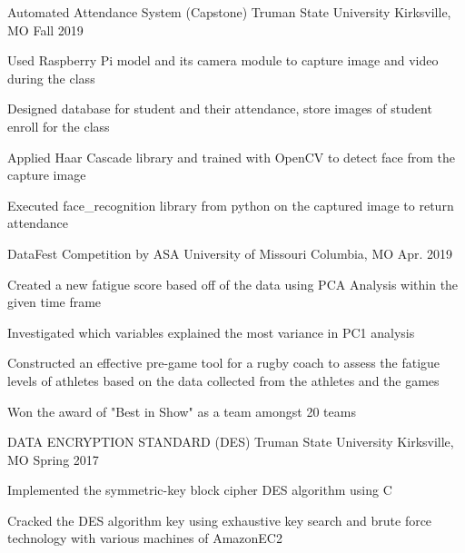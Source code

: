 \begin{cventries}
  \cventry
    {Automated Attendance System (Capstone) }
    {Truman State University}
    {Kirksville, MO}
    {Fall 2019 }
    {
      \begin{cvitems}
        \item {Used Raspberry Pi model and its camera module to capture image and video during the class}
        \vspace{0.5mm}
        \item {Designed database for student and their attendance, store images of student enroll for the class}
        \vspace{0.5mm}
        \item{Applied Haar Cascade library and trained with OpenCV to detect face from the capture image}
        \vspace{0.5mm}
        \item {Executed face\_recognition library from python on the captured image to return attendance}
        \vspace{0.1mm}
      \end{cvitems}
    }
  \vspace{-5mm}  
  
  \cventry
    {DataFest Competition by ASA}
    {University of Missouri}
    {Columbia, MO}
    {Apr. 2019}
    {
      \begin{cvitems}
        \vspace{0.5mm}
        \item {Created a new fatigue score based off of the data using PCA Analysis within the given time frame }
        \vspace{0.5mm}
        \item {Investigated which variables explained the most variance in PC1 analysis}
        \vspace{0.5mm}
        \item {Constructed an effective pre-game tool for a rugby coach to assess the fatigue levels of athletes based on the data collected from the athletes and the games}
        \vspace{0.5mm} 
        \item {Won the award of "Best in Show" as a team amongst 20 teams}
      \end{cvitems}
    }
  \vspace{-5mm} 
  
  \cventry
    {DATA ENCRYPTION STANDARD (DES)}
    {Truman State University}
    {Kirksville, MO}
    {Spring 2017}
    {
      \begin{cvitems}
        \vspace{0.5mm} 
        \item {Implemented the symmetric-key block cipher DES algorithm using C }
        \vspace{0.5mm}
        \item {Cracked the DES algorithm key using exhaustive key search and brute force technology with various machines of AmazonEC2}
      \end{cvitems}
    }
\end{cventries}
\vspace{-5mm} 

